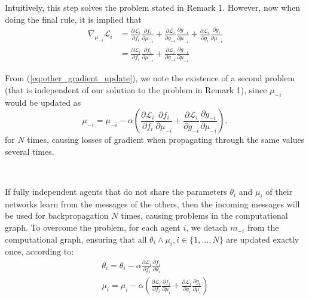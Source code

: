 \documentclass{article}
\begin{document}
Intuitively, this step solves the problem stated in Remark 1. However, now when doing the final rule, it is implied that
\begin{equation}\label{eq:other_gradient_update}
\begin{aligned}
\nabla_{\mu_{-i}} \mathcal{L}_i & =\frac{\partial \mathcal{L}_i}{\partial f_i} \frac{\partial f_i}{\partial \mu_{-i}}+\frac{\partial \mathcal{L}_i}{\partial g_{-i}} \frac{\partial g_{-i}}{\partial \mu_{-i}}+\frac{\partial \mathcal{L}_i}{\partial g_i} \frac{\partial g_i}{\partial \mu_{-i}} \\
& =\frac{\partial \mathcal{L}_i}{\partial f_i} \frac{\partial f_i}{\partial \mu_{-i}}+\frac{\partial \mathcal{L}_i}{\partial g_{-i}} \frac{\partial g_{-i}}{\partial \mu_{-i}}
\end{aligned}
\end{equation}

From (\ref{eq:other_gradient_update}), we note the existence of a second problem (that is independent of our solution to the problem in Remark 1), since $\mu_{-i}$ would be updated as
\begin{equation}
\mu_{-i}=\mu_{-i}-\alpha\left(\frac{\partial \mathcal{L}_i}{\partial f_i} \frac{\partial f_i}{\partial \mu_{-i}}+\frac{\partial \mathcal{L}_i}{\partial g_{-i}} \frac{\partial g_{-i}}{\partial \mu_{-i}}\right),
\end{equation}
for $N$ times, causing losses of gradient when propagating through the same values several times.

\

If fully independent agents that do not share the parameters $\theta_i$ and $\mu_i$ of their networks learn from the messages of the others, then the incoming messages will be used for backpropagation $N$ times, causing problems in the computational graph. To overcome the problem, for each agent $i$, we detach $m_{-i}$ from the computational graph, ensuring that all $\theta_i \wedge \mu_i, i \in\{1, \ldots, N\}$ are updated exactly once, according to:
\begin{equation}
\begin{gathered}
\theta_i=\theta_i-\alpha \frac{\partial \mathcal{L}_i}{\partial f_i} \frac{\partial f_i}{\partial \theta_i}\\
\mu_i=\mu_i-\alpha\left(\frac{\partial \mathcal{L}_i}{\partial f_i} \frac{\partial f_i}{\partial \mu_i}+\frac{\partial \mathcal{L}_i}{\partial g_i} \frac{\partial g_i}{\partial \mu_i}\right)
\end{gathered}
\end{equation}
\end{document}
